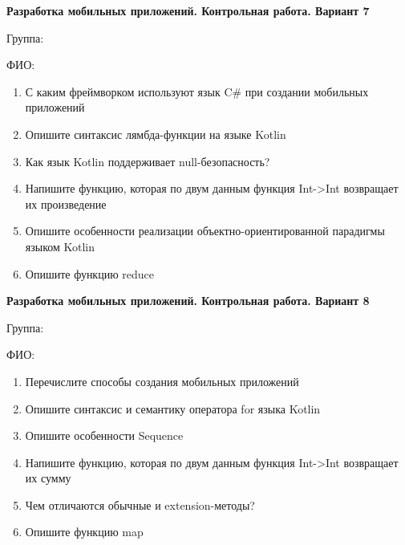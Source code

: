 \documentclass[12pt]{article}
\begin{document}
\newpage\begin{minipage}{\textwidth}
\textbf{Разработка мобильных приложений. Контрольная работа. Вариант 7}

Группа: \underline{\hspace{3cm}}

ФИО: \underline{\hspace{10cm}}

\begin{enumerate}
\item С каким фреймворком используют язык C\# при создании мобильных приложений
\item Опишите синтаксис лямбда-функции на языке Kotlin
\item Как язык Kotlin поддерживает null-безопасность?
\item Напишите функцию, которая по двум данным функция Int->Int возвращает их произведение
\item Опишите особенности реализации объектно-ориентированной парадигмы языком Kotlin
\item Опишите функцию reduce

\end{enumerate}
\end{minipage}

\newpage\begin{minipage}{\textwidth}
\textbf{Разработка мобильных приложений. Контрольная работа. Вариант 8}

Группа: \underline{\hspace{3cm}}

ФИО: \underline{\hspace{10cm}}

\begin{enumerate}
\item Перечислите способы создания мобильных приложений
\item Опишите синтаксис и семантику оператора for языка Kotlin
\item Опишите особенности Sequence
\item Напишите функцию, которая по двум данным функция Int->Int возвращает их сумму
\item Чем отличаются обычные и extension-методы?
\item Опишите функцию map

\end{enumerate}
\end{minipage}
\end{document}
